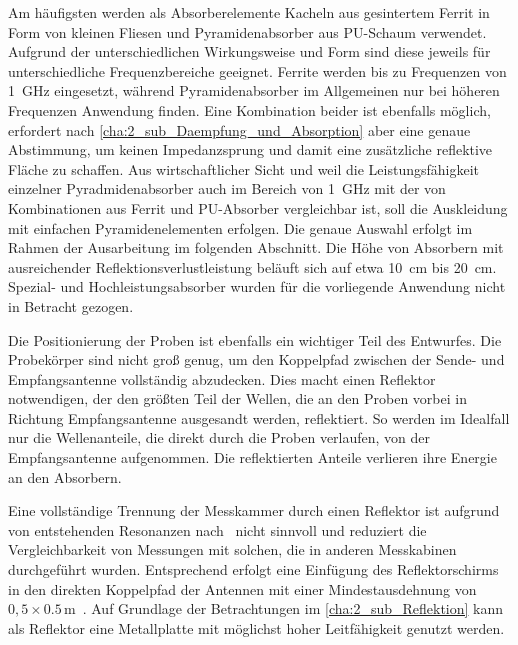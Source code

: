 \par
\vspace{\linespace}
Am häufigsten werden als Absorberelemente Kacheln aus gesintertem Ferrit in Form von kleinen Fliesen und Pyramidenabsorber aus PU-Schaum verwendet. Aufgrund der unterschiedlichen Wirkungsweise und Form sind diese jeweils für unterschiedliche Frequenzbereiche geeignet. Ferrite werden bis zu Frequenzen von \SI{1}{\giga\hertz} eingesetzt, während Pyramidenabsorber im Allgemeinen nur bei höheren Frequenzen Anwendung finden. Eine Kombination beider ist ebenfalls möglich, erfordert nach \Abschnitt\ref{cha:2_sub_Daempfung_und_Absorption} aber eine genaue Abstimmung, um keinen Impedanzsprung und damit eine zusätzliche reflektive Fläche zu schaffen. Aus wirtschaftlicher Sicht und weil die Leistungsfähigkeit einzelner Pyradmidenabsorber auch im Bereich von \SI{1}{\giga\hertz} mit der von Kombinationen aus Ferrit und PU-Absorber vergleichbar ist, soll die Auskleidung mit einfachen Pyramidenelementen erfolgen. Die genaue Auswahl erfolgt im Rahmen der Ausarbeitung im folgenden Abschnitt. Die Höhe von Absorbern mit ausreichender Reflektionsverlustleistung beläuft sich auf etwa \SI{10}{\centi\meter} bis \SI{20}{\centi\meter}. Spezial- und Hochleistungsabsorber wurden für die vorliegende Anwendung nicht in Betracht gezogen. 
\par
\vspace{\linespace} 
Die Positionierung der Proben ist ebenfalls ein wichtiger Teil des Entwurfes. Die Probekörper sind nicht groß genug, um den Koppelpfad zwischen der Sende- und Empfangsantenne vollständig abzudecken. Dies macht einen Reflektor notwendigen, der den größten Teil der Wellen, die an den Proben vorbei in Richtung Empfangsantenne ausgesandt werden, reflektiert. So werden im Idealfall nur die Wellenanteile, die direkt durch die Proben verlaufen, von der Empfangsantenne aufgenommen. Die reflektierten Anteile verlieren ihre Energie an den Absorbern.   
\par
\vspace{\linespace}
Eine vollständige Trennung der Messkammer durch einen Reflektor ist aufgrund von entstehenden Resonanzen nach~\cite{Techniques_Shielding_Effectiveness_Far_Field_Simulation} nicht sinnvoll und reduziert die Vergleichbarkeit von Messungen mit solchen, die in anderen Messkabinen durchgeführt wurden. Entsprechend erfolgt eine Einfügung des Reflektorschirms in den direkten Koppelpfad der Antennen mit einer Mindestausdehnung von $0,5 \times 0.5\,\si{\meter}$~\cite{DIN_EN_61000-4-3}. Auf Grundlage der Betrachtungen im \Abschnitt\ref{cha:2_sub_Reflektion} kann als Reflektor eine Metallplatte mit möglichst hoher Leitfähigkeit genutzt werden.
